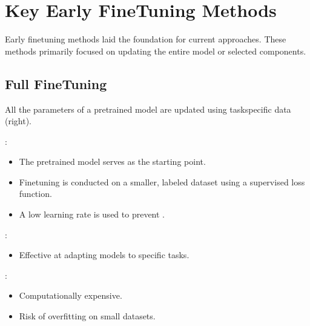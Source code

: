 \documentclass[letterpaper,11pt,english]{sphinxmanual}
\begin{document}
\section{Key Early Fine\sphinxhyphen{}Tuning Methods}
\label{\detokenize{finetuning:key-early-fine-tuning-methods}}
\sphinxAtStartPar
Early fine\sphinxhyphen{}tuning methods laid the foundation for current approaches. These methods
primarily focused on updating the entire model or selected components.


\subsection{Full Fine\sphinxhyphen{}Tuning}
\label{\detokenize{finetuning:full-fine-tuning}}
\sphinxAtStartPar
All the parameters of a pre\sphinxhyphen{}trained model are updated using task\sphinxhyphen{}specific data {\hyperref[\detokenize{finetuning:fig-fine-tuning}]{}} (right).

\sphinxAtStartPar
{}:
\begin{itemize}
\item {} 
\sphinxAtStartPar
The pre\sphinxhyphen{}trained model serves as the starting point.

\item {} 
\sphinxAtStartPar
Fine\sphinxhyphen{}tuning is conducted on a smaller, labeled dataset using a supervised loss function.

\item {} 
\sphinxAtStartPar
A low learning rate is used to prevent .

\end{itemize}

\sphinxAtStartPar
{}:
\begin{itemize}
\item {} 
\sphinxAtStartPar
Effective at adapting models to specific tasks.

\end{itemize}

\sphinxAtStartPar
{}:
\begin{itemize}
\item {} 
\sphinxAtStartPar
Computationally expensive.

\item {} 
\sphinxAtStartPar
Risk of overfitting on small datasets.

\end{itemize}
\end{document}
